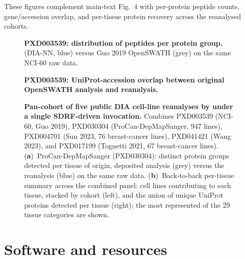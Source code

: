 \documentclass[preprint,12pt]{elsarticle}
\begin{document}
These figures complement main-text Fig.~4 with per-protein peptide counts, gene/accession overlap, and per-tissue protein recovery across the reanalysed cohorts.

\begin{figure}[htbp]
  \centering
  \caption[PXD003539 peptides per protein]{%
    \textbf{PXD003539: distribution of peptides per protein group.}
    \quantmsdiann{} (DIA-NN, blue) versus Guo 2019 OpenSWATH (grey)
    on the same NCI-60 raw data.
  }
  \label{fig:supp-pxd003539-peptides}
\end{figure}

\begin{figure}[htbp]
  \centering
  \caption[PXD003539 accession overlap]{%
    \textbf{PXD003539: UniProt-accession overlap between original
    OpenSWATH analysis and \quantmsdiann{} reanalysis.}
  }
  \label{fig:supp-pxd003539-venn}
\end{figure}

\begin{figure}[htbp]
  \centering
  \caption[Pan-cohort cell-line atlas]{%
    \textbf{Pan-cohort of five public DIA cell-line reanalyses by
    \quantmsdiann{} under a single SDRF-driven invocation.}
    Combines PXD003539 (NCI-60, Guo 2019), PXD030304 (ProCan-DepMapSanger,
    947 lines), PXD004701 (Sun 2023, 76 breast-cancer lines), PXD041421
    (Wang 2023), and PXD017199 (Tognetti 2021, 67 breast-cancer lines).
    (\textbf{a})~ProCan-DepMapSanger (PXD030304): distinct protein groups
    detected per tissue of origin, deposited analysis (grey) versus the
    \quantmsdiann{} reanalysis (blue) on the same raw data.
    (\textbf{b})~Back-to-back per-tissue summary across the combined panel:
    cell lines contributing to each tissue, stacked by cohort (left), and the
    union of unique UniProt proteins detected per tissue (right); the most
    represented of the 29 tissue categories are shown.
  }
  \label{fig:supp-pancohort-atlas}
\end{figure}

\section{Software and resources}
\label{sec:supp-software}
\end{document}
